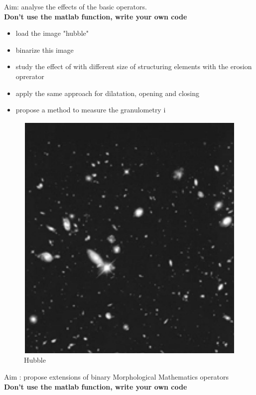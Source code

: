 \documentclass[12pt]{tdtp}
\begin{document}
\titre

\Exo
Aim: analyse the effects of the basic operators.
\\
\textbf{Don't use the matlab function, write your own code}
\begin{itemize}
	\item load the image "hubble"
	\item binarize this image
	\item study the effect of with different size of structuring elements with the erosion oprerator
	\item apply the same approach for dilatation, opening and closing
	\item propose a method to measure the granulometry
i\end{itemize}


\begin{figure}[h!]
	\begin{center}
		\includegraphics[scale=0.5]{images/hubble.png}
		\caption{Hubble}
		\label{Galaxy}
	\end{center}
\end{figure}


\newpage 
\Exo

Aim : propose extensions of binary Morphological Mathematics operators\\

\textbf{Don't use the matlab function, write your own code}
\end{document}
